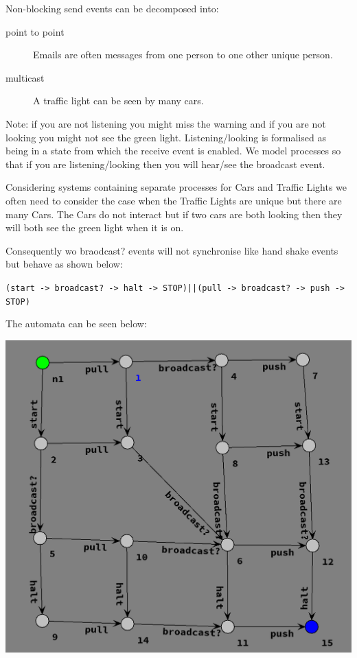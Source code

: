 \documentclass[]{article}
\begin{document}
Non-blocking send events can be decomposed into:
\begin{description}
\item[point to point] Emails are often messages from one person to one other  unique person.
\item[multicast] A traffic light can be seen by many cars.
\end{description}





	
	
Note: if you are not listening you might miss the warning and if you are not looking you might not see the green light. Listening/looking is formalised as being in a state from which the receive event is enabled. We model processes so that if you are listening/looking then you will hear/see the broadcast event.



Considering systems containing separate processes for  {\sf Cars} and {\sf Traffic Lights} we often need to consider the case when the {\sf Traffic Lights} are unique but there are many {\sf Cars}.  The {\sf Cars} do not interact but if two cars are both looking then they will both see the green light when it is on.

Consequently wo  {\sf braodcast?} events will not synchronise  like  hand shake events but behave as shown below:


\begin{center}\verb$(start -> broadcast? -> halt -> STOP)||(pull -> broadcast? -> push -> STOP)$
\end{center}
The automata  can be seen  below:
\begin{center}	
	\includegraphics[scale=0.5]{BcastPar2.png} \end{center}
	
\end{document}
